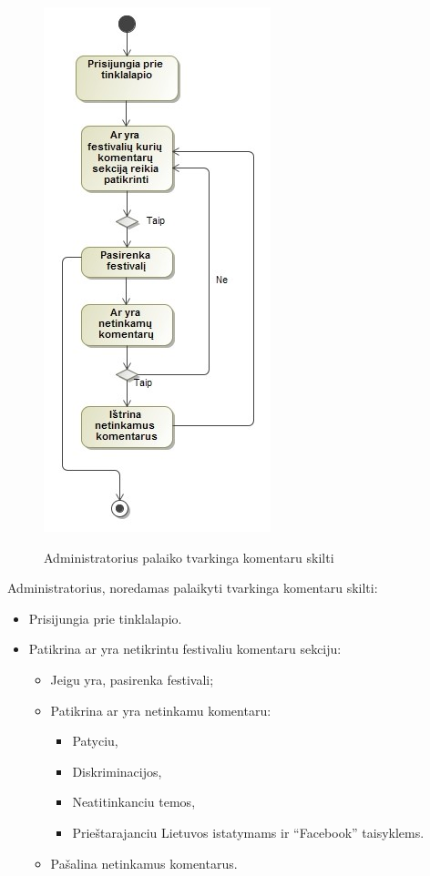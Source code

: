﻿\documentclass{VUMIFPSkursinis}
\begin{document}
\begin{figure}[H]
    \centering
    \includegraphics[scale=0.7]{img/geri/adminKom}
    \label{img:uml15}
	\caption{Administratorius palaiko tvarkinga komentaru skilti}
\end{figure}

Administratorius, noredamas palaikyti tvarkinga komentaru skilti:
\begin{itemize}
\item Prisijungia prie tinklalapio.
\item Patikrina ar yra netikrintu festivaliu komentaru sekciju:
\begin{itemize}
\item Jeigu yra, pasirenka festivali;
\item Patikrina ar yra netinkamu komentaru:
\begin{itemize}
\item Patyciu,
\item Diskriminacijos,
\item Neatitinkanciu temos,
\item Prieštarajanciu Lietuvos istatymams ir “Facebook” taisyklems.
\end{itemize}
\item Pašalina netinkamus komentarus.	
\end{itemize}
\end{itemize}
\end{document}
